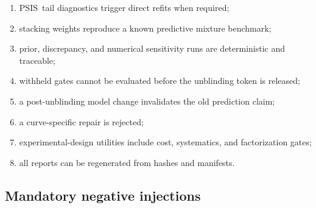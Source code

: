 \documentclass[11pt]{article}
\newcommand{\PSIS}{\ensuremath{\mathrm{PSIS}}}
\begin{document}
\begin{enumerate}
\item \PSIS\ tail diagnostics trigger direct refits when required;
\item stacking weights reproduce a known predictive mixture benchmark;
\item prior, discrepancy, and numerical sensitivity runs are deterministic and
traceable;
\item withheld gates cannot be evaluated before the unblinding token is
released;
\item a post-unblinding model change invalidates the old prediction claim;
\item a curve-specific repair is rejected;
\item experimental-design utilities include cost, systematics, and
factorization gates;
\item all reports can be regenerated from hashes and manifests.
\end{enumerate}

\subsection{Mandatory negative injections}
\end{document}
